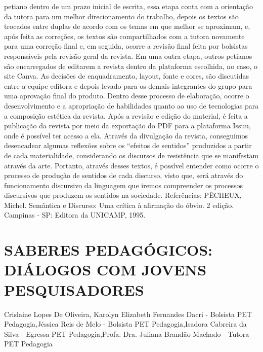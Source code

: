 petiano dentro de um prazo inicial de escrita, essa etapa conta com a orientação da tutora para
um melhor direcionamento do trabalho, depois os textos são trocados entre duplas de acordo com
os temas em que melhor se aproximam, e, após feita as correções, os textos são compartilhados
com a tutora novamente para uma correção final e, em seguida, ocorre a revisão final feita por
bolsistas responsáveis pela revisão geral da revista. Em uma outra etapa, outros petianos são
encarregados de editarem a revista dentro da plataforma escolhida, no caso, o site Canva. As
decisões de enquadramento, layout, fonte e cores, são discutidas entre a equipe editora e depois
levado para os demais integrantes do grupo para uma aprovação final do produto. Dentro desse
processo de elaboração, ocorre o desenvolvimento e a apropriação de habilidades quanto ao uso
de tecnologias para a composição estética da revista. Após a revisão e edição do material, é feita
a publicação da revista por meio da exportação do PDF para a plataforma Issuu, onde é possível
ter acesso a ela. Através da divulgação da revista, conseguimos desencadear algumas reflexões
sobre os “efeitos de sentidos” produzidos a partir de cada materialidade, considerando os
discursos de resistência que se manifestam através da arte. Portanto, através desses textos, é
possível entender como ocorre o processo de produção de sentidos de cada discurso, visto que,
será através do funcionamento discursivo da linguagem que iremos compreender os processos
discursivos que produzem os sentidos na sociedade.
Referências:
PÊCHEUX, Michel. Semântica e Discurso: Uma crítica à afirmação do óbvio. 2 edição.
Campinas - SP: Editora da UNICAMP, 1995.



\section{SABERES PEDAGÓGICOS: DIÁLOGOS COM JOVENS PESQUISADORES}

Crislaine Lopes De Oliveira, Karolyn Elizabeth Fernandes Dacri - Bolsista PET Pedagogia,Jéssica Reis de Melo - Bolsista PET Pedagogia,Isadora Cabreira da Silva - Egressa PET Pedagogia,Profa. Dra. Juliana Brandão Machado - Tutora PET Pedagogia

